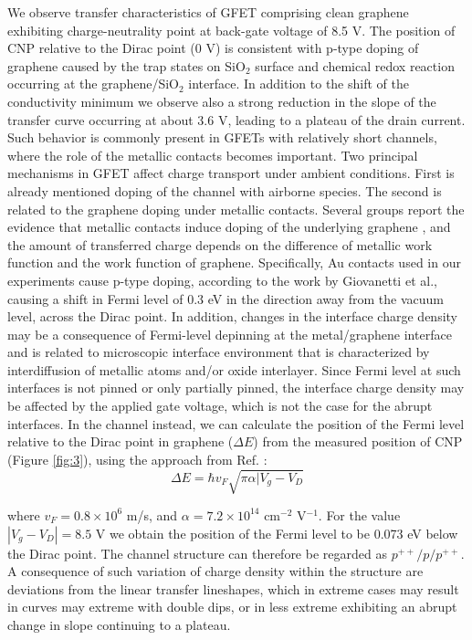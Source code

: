 \documentclass[preprint,aip,jap]{revtex4-2}
\begin{document}
We observe transfer characteristics of GFET comprising clean graphene exhibiting charge-neutrality point at back-gate voltage of 8.5 V.  The position of CNP relative to the Dirac point (0 V) is consistent with p-type doping of graphene caused by the trap states on SiO$_{2}$ surface and chemical redox reaction occurring at the graphene/SiO$_{2}$ interface\cite{feng-2014,peng-2017,lafkioti-2010}.  In addition to the shift of the conductivity minimum we observe also a strong reduction in the slope of the transfer curve occurring at about 3.6 V, leading to a plateau of the drain current.  Such behavior is commonly present in GFETs with relatively short channels, where the role of the metallic contacts becomes important\cite{bartolomeo-2015,nouchi-2008,nouchi-2014}. Two principal mechanisms in GFET affect charge transport under ambient conditions. First is already mentioned doping of the channel with airborne species. The second is related to the graphene doping under metallic contacts\cite{farmer-2009,giovannetti-2008,lee-2008,mueller-2009}.  Several groups report the evidence that metallic contacts induce doping of the underlying graphene \cite{giovannetti-2008,mueller-2009,huard-2008}, and the amount of transferred charge depends on the difference of metallic work function and the work function of graphene.  Specifically, Au contacts used in our experiments cause p-type doping, according to the work by Giovanetti et al.\cite{giovannetti-2008}, causing a shift in Fermi level of 0.3 eV in the direction away from the vacuum level, across the Dirac point. In addition, changes in the interface charge density may be a consequence of Fermi-level depinning at the metal/graphene interface and is related to microscopic interface environment that is characterized by interdiffusion of metallic atoms and/or oxide interlayer\cite{nouchi-2008,nouchi-2014}. Since Fermi level at such interfaces is not pinned or only partially pinned\cite{dibartolomeo-2011}, the interface charge density may be affected by the applied gate voltage, which is not the case for the abrupt interfaces.  In the channel instead, we can calculate the position of the Fermi level relative to the Dirac point in graphene ($\Delta E$) from the measured position of CNP (Figure \ref{fig:3}), using the approach from Ref. :
\begin{equation}
  \label{eq:1}
  \Delta E = \hbar v_{F}\sqrt{\pi\alpha|V_{g}-V_{D}}
\end{equation}

where $v_F=0.8\times10^6$ m/s, and $\alpha=7.2\times10^{14}$ cm$^{-2}$ V$^{-1}$. For the value $|V_g-V_D |=8.5$ V we obtain the position of the Fermi level to be 0.073 eV below the Dirac point. The channel structure can therefore be regarded as $p^{++}/p/p^{++}$. A consequence of such variation of charge density within the structure are deviations from the linear transfer lineshapes, which in extreme cases may result in curves may extreme with double dips\cite{nouchi-2014,nam-2012}, or in less extreme exhibiting an abrupt change in slope continuing to a plateau. 
\end{document}
